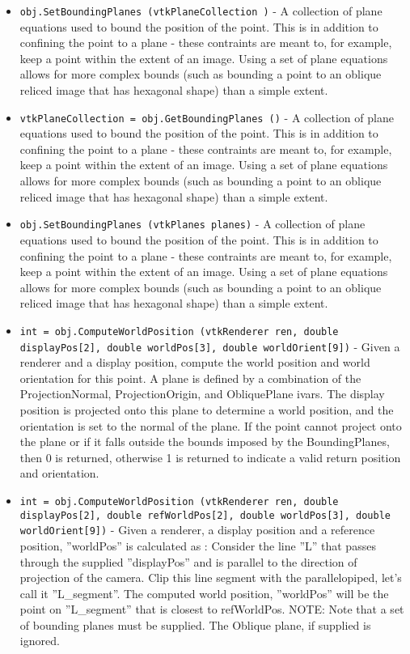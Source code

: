 \begin{itemize}
\item  \verb|obj.SetBoundingPlanes (vtkPlaneCollection )| -  A collection of plane equations used to bound the position of the point.
 This is in addition to confining the point to a plane - these contraints
 are meant to, for example, keep a point within the extent of an image.
 Using a set of plane equations allows for more complex bounds (such as
 bounding a point to an oblique reliced image that has hexagonal shape)
 than a simple extent.

\item  \verb|vtkPlaneCollection = obj.GetBoundingPlanes ()| -  A collection of plane equations used to bound the position of the point.
 This is in addition to confining the point to a plane - these contraints
 are meant to, for example, keep a point within the extent of an image.
 Using a set of plane equations allows for more complex bounds (such as
 bounding a point to an oblique reliced image that has hexagonal shape)
 than a simple extent.

\item  \verb|obj.SetBoundingPlanes (vtkPlanes planes)| -  A collection of plane equations used to bound the position of the point.
 This is in addition to confining the point to a plane - these contraints
 are meant to, for example, keep a point within the extent of an image.
 Using a set of plane equations allows for more complex bounds (such as
 bounding a point to an oblique reliced image that has hexagonal shape)
 than a simple extent.

\item  \verb|int = obj.ComputeWorldPosition (vtkRenderer ren, double displayPos[2], double worldPos[3], double worldOrient[9])| -  Given a renderer and a display position, compute the 
 world position and world orientation for this point. 
 A plane is defined by a combination of the
 ProjectionNormal, ProjectionOrigin, and ObliquePlane
 ivars. The display position is projected onto this
 plane to determine a world position, and the 
 orientation is set to the normal of the plane. If
 the point cannot project onto the plane or if it
 falls outside the bounds imposed by the
 BoundingPlanes, then 0 is returned, otherwise 1 is
 returned to indicate a valid return position and
 orientation.

\item  \verb|int = obj.ComputeWorldPosition (vtkRenderer ren, double displayPos[2], double refWorldPos[2], double worldPos[3], double worldOrient[9])| -  Given a renderer, a display position and a reference position, ''worldPos''
 is calculated as :
   Consider the line ''L'' that passes through the supplied ''displayPos'' and
 is parallel to the direction of projection of the camera. Clip this line
 segment with the parallelopiped, let's call it ''L\_segment''. The computed 
 world position, ''worldPos'' will be the point on ''L\_segment'' that is 
 closest to refWorldPos.
 NOTE: Note that a set of bounding planes must be supplied. The Oblique
       plane, if supplied is ignored.


\end{itemize}
